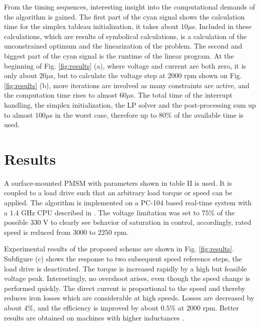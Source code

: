 \documentclass[a4paper,11pt,fleqn]{article}
\begin{document}
From the timing sequences, interesting insight into the computational demands of the algorithm is gained. The first part of the cyan signal shows the calculation time for the simplex tableau initialization, it takes about $10\mu$s. Included in these calculations, which are results of symbolical calculations, is a calculation of the unconstrained optimum and the linearization of the problem. The second and biggest part of the cyan signal is the runtime of the linear program. At the beginning of Fig. \ref{fig:results} (a), where voltage and current are both zero, it is only about $20\mu$s, but to calculate the voltage step at $2000$ rpm shown on Fig. \ref{fig:results} (b), more iterations are involved as many constraints are active, and the computation time rises to almost $60\mu$s. The total time of the interrupt handling, the simplex initialization, the LP solver and the post-processing sum up to almost $100\mu$s in the worst case, therefore up to $80\%$ of the available time is used. 









\section*{Results}

A surface-mounted PMSM with parameters shown in table II is used. It is coupled to a load drive such that an arbitrary load torque or speed can be applied. The algorithm is implemented on a PC-104 based real-time system with a $1.4$ GHz CPU described in \cite{Nael}. The voltage limitation was set to $75\%$ of the possible $330$ V to clearly see behavior of saturation in control, accordingly, rated speed is reduced from $3000$ to $2250$ rpm.

Experimental results of the proposed scheme are shown in Fig. \ref{fig:results}. Subfigure (c) shows the response to two subsequent speed reference steps, the load drive is deactivated. The torque is increased rapidly by a high but feasible voltage peak. Interestingly, no overshoot arises, even though the speed change is performed quickly. The direct current is proportional to the speed and thereby reduces iron losses which are considerable at high speeds. Losses are decreased by about $4\%$, and the efficiency is improved by about $0.5\%$ at $2000$ rpm. Better results are obtained on machines with higher inductances \cite{PMSMeff}.
\end{document}
